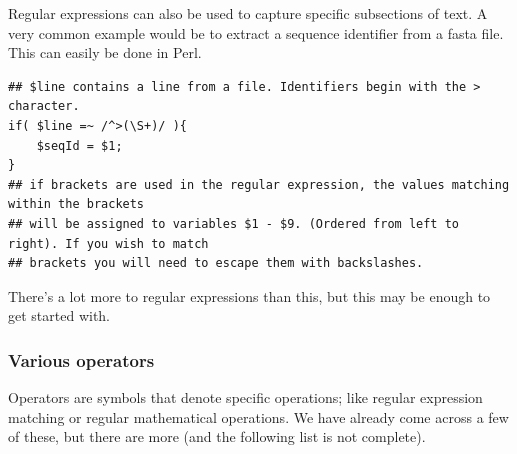 \documentclass[11pt]{article}
\begin{document}
Regular expressions can also be used to capture specific subsections of
text. A very common example would be to extract a sequence identifier
from a fasta file. This can easily be done in Perl.

\begin{verbatim}
## $line contains a line from a file. Identifiers begin with the > character.
if( $line =~ /^>(\S+)/ ){
    $seqId = $1;
}
## if brackets are used in the regular expression, the values matching within the brackets
## will be assigned to variables $1 - $9. (Ordered from left to right). If you wish to match
## brackets you will need to escape them with backslashes.
\end{verbatim}

There's a lot more to regular expressions than this, but this may be enough to get
started with.

\subsubsection{Various operators}
\label{sec-9-0-7}

Operators are symbols that denote specific operations; like regular
expression matching or regular mathematical operations. We have already
come across a few of these, but there are more (and the following list
is not complete).
\end{document}

